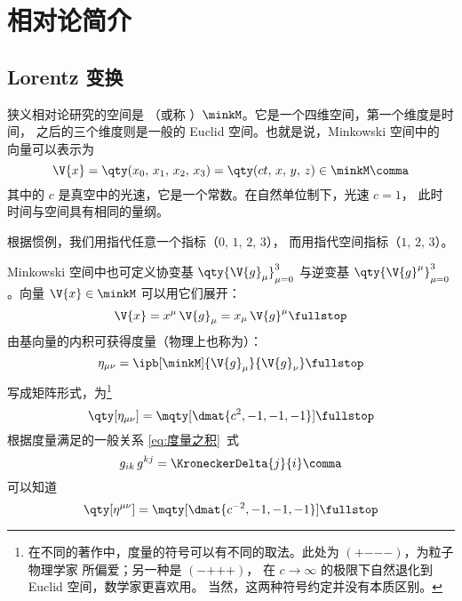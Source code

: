\chapter{相对论简介}
\section{Lorentz 变换}
狭义相对论研究的空间是 （或称
）$\minkM$。它是一个四维空间，第一个维度是时间，
之后的三个维度则是一般的 Euclid 空间。也就是说，Minkowski 空间中的
向量可以表示为
\begin{equation}
  \V{x} = \qty(x_0,\,x_1,\,x_2,\,x_3)
  = \qty(ct,\,x,\,y,\,z)\in\minkM \comma
\end{equation}
其中的 $c$ 是真空中的光速，它是一个常数。在自然单位制下，光速 $c=1$，
此时时间与空间具有相同的量纲。

根据惯例，我们用指代任意一个指标（$0,\,1,\,2,\,3$），
而用指代空间指标（$1,\,2,\,3$）。

Minkowski 空间中也可定义协变基 $\qty{\V{g}_\mu}_{\mu=0}^3$ 与逆变基
$\qty{\V{g}^\mu_{\vphantom{\mu}}}_{\mu=0}^3$。向量 $\V{x}\in\minkM$
可以用它们展开：
\begin{equation}
  \V{x} = x^\mu\,\V{g}_\mu = x_\mu\,\V{g}^\mu \fullstop
\end{equation}
由基向量的内积可获得度量（物理上也称为）：
\begin{equation}
  \eta_{\mu\nu} = \ipb[\minkM]{\V{g}_\mu}{\V{g}_\nu} \fullstop
\end{equation}
写成矩阵形式，为\footnote{
  在不同的著作中，度量的符号可以有不同的取法。此处为
  $(\mathord{+}\mathord{-}\mathord{-}\mathord{-})$，为粒子物理学家
  所偏爱；另一种是 $(\mathord{-}\mathord{+}\mathord{+}\mathord{+})$，
  在 $c\to\infty$ 的极限下自然退化到 Euclid 空间，数学家更喜欢用。
  当然，这两种符号约定并没有本质区别。}
\begin{equation}
  \qty[\eta_{\mu\nu}] = \mqty[\dmat{c^2, -1, -1, -1}] \fullstop
\end{equation}
根据度量满足的一般关系 \eqref{eq:度量之积}~式
\begin{equation}
  g_{ik}\,g^{kj} = \KroneckerDelta{j}{i} \comma
\end{equation}
可以知道
\begin{equation}
  \qty[\eta^{\mu\nu}] = \mqty[\dmat{c^{-2}, -1, -1, -1}] \fullstop
\end{equation}


